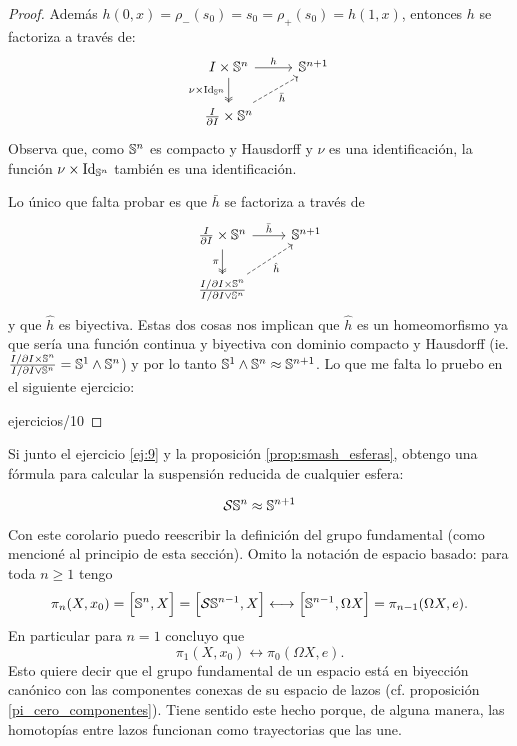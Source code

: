 \documentclass[../../topologia_algebraica]{subfiles}
\begin{document}
\begin{proof}
  Adem\'as $h(0,x)=\rho_-(s_0)=s_0=\rho_+(s_0)=h(1,x)$, entonces $h$ se factoriza a trav\'es de:
  \[
    \begin{tikzcd}
      I\times\Sn^n \arrow[d,twoheadrightarrow,"\nu\times\Id_{\Sn^n}"'] \arrow[r,"h"] & \Sn^{n+1} \\
      \frac{I}{\partial I}\times\Sn^n \arrow[ur,dashed,"\bar{h}"'] &
    \end{tikzcd}
  \]
  Observa que, como $\mathbb{S}^n$ es compacto y Hausdorff y $\nu$ es una identificaci\'on, la funci\'on
  $\nu\times\text{Id}_{\mathbb{S}^n}$ tambi\'en es una identificaci\'on.

  Lo \'unico que falta probar es que $\bar{h}$ se factoriza a trav\'es de
  \[
    \begin{tikzcd}
      \frac{I}{\partial I}\times\Sn^n \arrow[d,twoheadrightarrow,"\pi"'] \arrow[r,"\bar{h}"] & \Sn^{n+1}\\
      \frac{I/\partial I\times\Sn^n}{I/\partial I\vee\Sn^n} \arrow[ur,dashed,"\hat{h}"'] &
    \end{tikzcd}
  \]
  y que $\hat{h}$ es biyectiva. Estas dos cosas nos implican que $\hat{h}$ es un
  homeomorfismo ya que ser\'ia una funci\'on continua y biyectiva con dominio compacto y Hausdorff
  (ie. $ \frac{I/\partial I\times\mathbb{S}^n}{I/\partial I\vee\mathbb{S}^n}=\mathbb{S}^1\wedge\mathbb{S}^n$) y por lo tanto
  $\mathbb{S}^1\wedge\mathbb{S}^n\approx\mathbb{S}^{n+1}$. Lo que me falta lo pruebo en el siguiente ejercicio:

{ejercicios/10} %
  
\end{proof}

Si junto el ejercicio \ref{ej:9} y la proposici\'on \ref{prop:smash_esferas}, obtengo una
f\'ormula para calcular la suspensi\'on reducida de cualquier esfera:

\begin{cor}\label{cor:suspension_esfera}
  \[
    \mathcal{S}\mathbb{S}^n\approx \mathbb{S}^{n+1}
  \] 
\end{cor}

Con este corolario puedo reescribir la definici\'on del grupo fundamental (como mencion\'e al
principio de esta secci\'on). Omito la notaci\'on de espacio basado: para toda $n\geq 1$ tengo
\[
  \pi_n(X,x_0)=\Big[ \mathbb{S}^n, X \Big]=
  \Big[ \mathcal{S}\mathbb{S}^{n-1},X \Big] \longleftrightarrow
  \Big[ \mathbb{S}^{n-1},\Omega X \Big]=
  \pi_{n-1}(\Omega X,e).
\]
En particular para $n=1$ concluyo que
\[
  \pi_1(X,x_0) \longleftrightarrow \pi_0(\Omega X, e).
\]
Esto quiere decir que el grupo fundamental de un espacio est\'a en biyecci\'on can\'onico
con las componentes conexas de su espacio de lazos (cf. proposici\'on \ref{pi_cero_componentes}).
Tiene sentido este hecho porque, de alguna manera, las homotop\'ias entre lazos funcionan como
trayectorias que las une.
\end{document}

